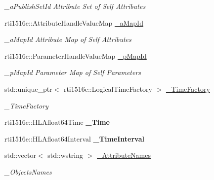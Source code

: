 \begin{DoxyCompactItemize}
\begin{DoxyCompactList}\small\item\em \+\_\+a\+Publish\+Set\+Id Attribute Set of Self Attributes \end{DoxyCompactList}\item 
\mbox{\label{classUPIM_1_1UPIMFederate_a9b45f96ab448d47abd0b51b949a4d7b8}} 
rti1516e\+::\+Attribute\+Handle\+Value\+Map \hyperlink{classUPIM_1_1UPIMFederate_a9b45f96ab448d47abd0b51b949a4d7b8}{\+\_\+a\+Map\+Id}
\begin{DoxyCompactList}\small\item\em \+\_\+a\+Map\+Id Attribute Map of Self Attributes \end{DoxyCompactList}\item 
\mbox{\label{classUPIM_1_1UPIMFederate_a2fb0b595659afa36468ccc0dc3f5bbfb}} 
rti1516e\+::\+Parameter\+Handle\+Value\+Map \hyperlink{classUPIM_1_1UPIMFederate_a2fb0b595659afa36468ccc0dc3f5bbfb}{\+\_\+p\+Map\+Id}
\begin{DoxyCompactList}\small\item\em \+\_\+p\+Map\+Id Parameter Map of Self Parameters \end{DoxyCompactList}\item 
std\+::unique\+\_\+ptr$<$ rti1516e\+::\+Logical\+Time\+Factory $>$ \hyperlink{classUPIM_1_1UPIMFederate_aa5ff7216cfac15dad5c2c9f09b2574cc}{\+\_\+\+Time\+Factory}
\begin{DoxyCompactList}\small\item\em \+\_\+\+Time\+Factory \end{DoxyCompactList}\item 
\mbox{\label{classUPIM_1_1UPIMFederate_a250a602331121c59a33a73cc3cd9c303}} 
rti1516e\+::\+H\+L\+Afloat64\+Time {\bfseries \+\_\+\+Time}
\item 
\mbox{\label{classUPIM_1_1UPIMFederate_a09018f39cd7cc45a4ec3cc5e215699d8}} 
rti1516e\+::\+H\+L\+Afloat64\+Interval {\bfseries \+\_\+\+Time\+Interval}
\item 
std\+::vector$<$ std\+::wstring $>$ \hyperlink{classUPIM_1_1UPIMFederate_a376d072fdb4489265af17d39a1a9a040}{\+\_\+\+Attribute\+Names}
\begin{DoxyCompactList}\small\item\em \+\_\+\+Objects\+Names \end{DoxyCompactList}\item 

\end{DoxyCompactItemize}
